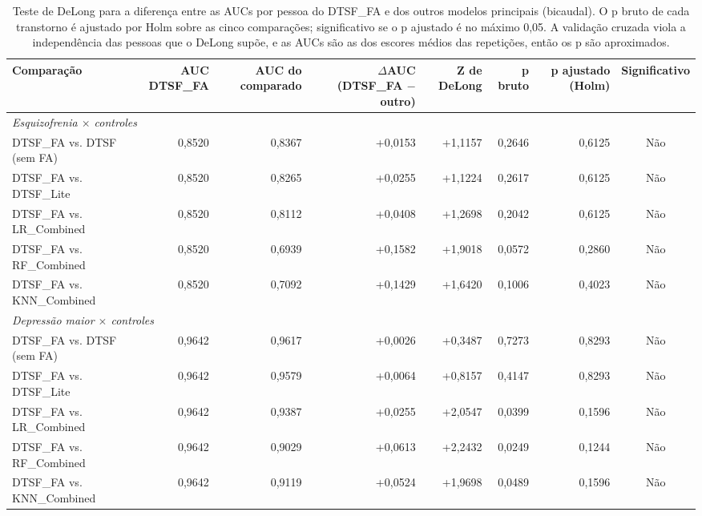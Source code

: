 \begin{table}[htbp]
\centering
\footnotesize
\begin{tabular}{lrrrrrrc}
\toprule
Comparação & AUC DTSF\_FA & AUC do comparado & $\Delta$AUC (DTSF\_FA $-$ outro) & Z de DeLong & p bruto & p ajustado (Holm) & Significativo \\
\midrule
\multicolumn{8}{l}{\textit{Esquizofrenia $\times$ controles}} \\
DTSF\_FA vs. DTSF (sem FA) & 0,8520 & 0,8367 & +0,0153 & +1,1157 & 0,2646 & 0,6125 & Não \\
DTSF\_FA vs. DTSF\_Lite & 0,8520 & 0,8265 & +0,0255 & +1,1224 & 0,2617 & 0,6125 & Não \\
DTSF\_FA vs. LR\_Combined & 0,8520 & 0,8112 & +0,0408 & +1,2698 & 0,2042 & 0,6125 & Não \\
DTSF\_FA vs. RF\_Combined & 0,8520 & 0,6939 & +0,1582 & +1,9018 & 0,0572 & 0,2860 & Não \\
DTSF\_FA vs. KNN\_Combined & 0,8520 & 0,7092 & +0,1429 & +1,6420 & 0,1006 & 0,4023 & Não \\
\midrule
\multicolumn{8}{l}{\textit{Depressão maior $\times$ controles}} \\
DTSF\_FA vs. DTSF (sem FA) & 0,9642 & 0,9617 & +0,0026 & +0,3487 & 0,7273 & 0,8293 & Não \\
DTSF\_FA vs. DTSF\_Lite & 0,9642 & 0,9579 & +0,0064 & +0,8157 & 0,4147 & 0,8293 & Não \\
DTSF\_FA vs. LR\_Combined & 0,9642 & 0,9387 & +0,0255 & +2,0547 & 0,0399 & 0,1596 & Não \\
DTSF\_FA vs. RF\_Combined & 0,9642 & 0,9029 & +0,0613 & +2,2432 & 0,0249 & 0,1244 & Não \\
DTSF\_FA vs. KNN\_Combined & 0,9642 & 0,9119 & +0,0524 & +1,9698 & 0,0489 & 0,1596 & Não \\
\bottomrule
\end{tabular}
\caption{Teste de DeLong para a diferença entre as AUCs por pessoa do DTSF\_FA e dos outros modelos principais (bicaudal). O p bruto de cada transtorno é ajustado por Holm sobre as cinco comparações; significativo se o p ajustado é no máximo 0,05. A validação cruzada viola a independência das pessoas que o DeLong supõe, e as AUCs são as dos escores médios das repetições, então os p são aproximados.}
\label{tab:res-delong}
\end{table}
